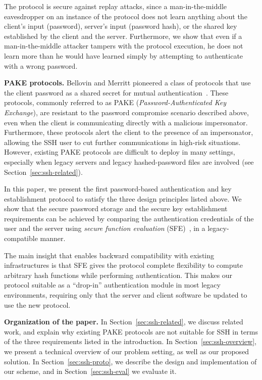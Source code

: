 The protocol is secure against replay attacks, since a man-in-the-middle
eavesdropper on an instance of the protocol does not learn anything about
the client's input (password), server's input (password hash), or the
shared key established by the client and the server.  Furthermore, we
show that even if a man-in-the-middle attacker tampers with the protocol
execution, he does not learn more than he would have learned simply by
attempting to authenticate with a wrong password.



\vspace{1ex}
\noindent
\textbf{PAKE protocols.}  
Bellovin and Merritt pioneered a class of protocols
that use the client password as a shared secret for mutual
authentication~\cite{bellovin92}. These protocols, commonly referred to
as PAKE (\emph{Password-Authenticated Key Exchange}), are resistant to
the password compromise scenario described above, even when the client is
communicating directly with a malicious impersonator.  Furthermore, these
protocols alert the client to the presence of an impersonator, allowing
the SSH user to cut further communications in high-risk situations.
However, existing PAKE protocols are difficult to deploy in many settings,
especially when legacy servers and legacy hashed-password files are
involved (see Section~\ref{sec:ssh-related}).

In this paper, we present the first password-based authentication and
key establishment protocol to satisfy the three design principles
listed above.  We show that the secure password storage and the
secure key establishment requirements can be achieved by comparing the
authentication credentials of the user and the server using \emph{secure
function evaluation} (SFE)~\cite{Y82}, in a legacy-compatible manner.

The main insight that enables backward compatibility with existing
infrastructures is that SFE gives the protocol complete flexibility
to compute arbitrary hash functions while performing authentication.
This makes our protocol suitable as a ``drop-in'' authentication module
in most legacy environments, requiring only that the server and client
software be updated to use the new protocol.


\vspace{1ex}
\noindent
\textbf{Organization of the paper.}  
In Section~\ref{sec:ssh-related}, we discuss related work, and explain why
existing PAKE protocols are not suitable for SSH in terms of the three
requirements listed in the introduction. In Section~\ref{sec:ssh-overview},
we present a technical overview of our problem setting, as well as our
proposed solution. In Section~\ref{sec:ssh-proto}, we describe the design
and implementation of our scheme, and in Section~\ref{sec:ssh-eval} we
evaluate it.

